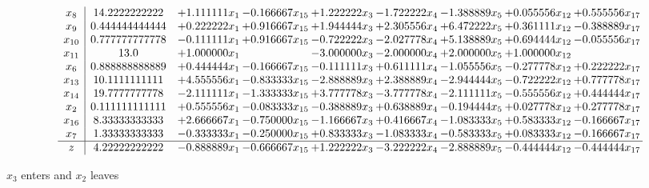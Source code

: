 \documentclass[10pt]{article}
\begin{document}
 \[\begin{array}{c| c c@{\hskip 2pt} c@{\hskip 2pt} c@{\hskip 2pt} c@{\hskip 2pt} c@{\hskip 2pt} c@{\hskip 2pt} c@{\hskip 2pt} }
 x_{8}   &  14.2222222222 & + 1.111111 x_{1} & -0.166667 x_{15} & + 1.222222 x_{3} & -1.722222 x_{4} & -1.388889 x_{5} & + 0.055556 x_{12} & + 0.555556 x_{17}\\
 x_{9}   &  0.444444444444 & + 0.222222 x_{1} & + 0.916667 x_{15} & + 1.944444 x_{3} & + 2.305556 x_{4} & + 6.472222 x_{5} & + 0.361111 x_{12} & -0.388889 x_{17}\\
 x_{10}   &  0.777777777778 & -0.111111 x_{1} & + 0.916667 x_{15} & -0.722222 x_{3} & -2.027778 x_{4} & + 5.138889 x_{5} & + 0.694444 x_{12} & -0.055556 x_{17}\\
 x_{11}   &  13.0 & + 1.000000 x_{1} &   & -3.000000 x_{3} & -2.000000 x_{4} & + 2.000000 x_{5} & + 1.000000 x_{12} &   \\
 x_{6}   &  0.888888888889 & + 0.444444 x_{1} & -0.166667 x_{15} & -0.111111 x_{3} & + 0.611111 x_{4} & -1.055556 x_{5} & -0.277778 x_{12} & + 0.222222 x_{17}\\
 x_{13}   &  10.1111111111 & + 4.555556 x_{1} & -0.833333 x_{15} & -2.888889 x_{3} & + 2.388889 x_{4} & -2.944444 x_{5} & -0.722222 x_{12} & + 0.777778 x_{17}\\
 x_{14}   &  19.7777777778 & -2.111111 x_{1} & -1.333333 x_{15} & + 3.777778 x_{3} & -3.777778 x_{4} & -2.111111 x_{5} & -0.555556 x_{12} & + 0.444444 x_{17}\\
 x_{2}   &  0.111111111111 & + 0.555556 x_{1} & -0.083333 x_{15} & -0.388889 x_{3} & + 0.638889 x_{4} & -0.194444 x_{5} & + 0.027778 x_{12} & + 0.277778 x_{17}\\
 x_{16}   &  8.33333333333 & + 2.666667 x_{1} & -0.750000 x_{15} & -1.166667 x_{3} & + 0.416667 x_{4} & -1.083333 x_{5} & + 0.583333 x_{12} & -0.166667 x_{17}\\
 x_{7}   &  1.33333333333 & -0.333333 x_{1} & -0.250000 x_{15} & + 0.833333 x_{3} & -1.083333 x_{4} & -0.583333 x_{5} & + 0.083333 x_{12} & -0.166667 x_{17}\\
\hline
z    &  4.22222222222 & -0.888889 x_{1} & -0.666667 x_{15} & + 1.222222 x_{3} & -3.222222 x_{4} & -2.888889 x_{5} & -0.444444 x_{12} & -0.444444 x_{17}\\
\end{array}\]


 $ x_{3} $ enters and $ x_{2} $ leaves 
\end{document}
